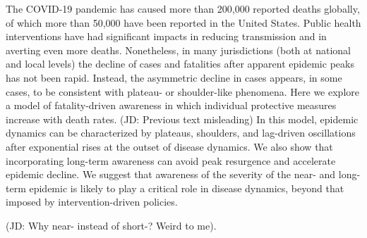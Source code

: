 The COVID-19 pandemic has caused more than 200,000 reported deaths
globally, of which more than 50,000 have been reported
in the United States. Public health interventions
have had significant impacts in reducing transmission and in
averting even more deaths. Nonetheless, in many jurisdictions
(both at national and local levels) the decline of cases and fatalities
after apparent epidemic peaks has not been rapid.  Instead, the asymmetric
decline in cases appears, in some cases, to be consistent
with plateau- or shoulder-like phenomena.  
Here we explore a model of fatality-driven
awareness in which individual protective measures increase
with death rates. (JD: Previous text misleading) 
In this model, epidemic dynamics
can be characterized by plateaus, shoulders,
and lag-driven oscillations after exponential rises
at the outset of disease dynamics. We also show that
incorporating long-term awareness can avoid peak resurgence and accelerate
epidemic decline.  We suggest that awareness of the severity of the near- and long-term epidemic is likely to play a critical
role in disease dynamics, beyond that imposed by intervention-driven policies.

(JD: Why near- instead of short-? Weird to me).
